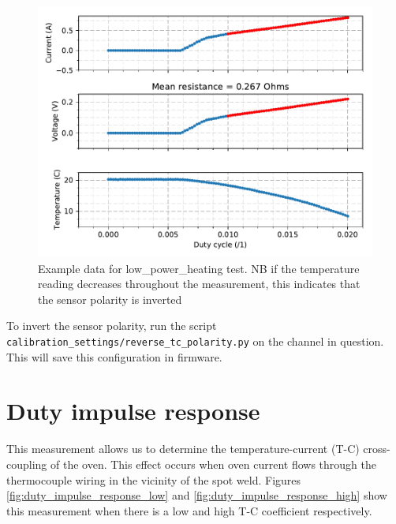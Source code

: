 \documentclass{article}
\begin{document}
\begin{figure}
    \center
    \includegraphics[scale=1]{figures/current_vs_duty_0.pdf} 
    \caption{Example data for low\_power\_heating test. NB if the temperature reading decreases throughout the measurement, this indicates that the sensor polarity is inverted}
    \label{fig:low_power_heating}
\end{figure}

To invert the sensor polarity, run the script \texttt{calibration\_settings/reverse\_tc\_polarity.py} on the channel in question. This will save this configuration in firmware.

\clearpage
\section{Duty impulse response}

This measurement allows us to determine the temperature-current (T-C) cross-coupling of the oven.
This effect occurs when oven current flows through the thermocouple wiring in the vicinity of the spot weld.
Figures \ref{fig:duty_impulse_response_low} and \ref{fig:duty_impulse_response_high} show this measurement when there is a low and high T-C coefficient respectively.
\end{document}
